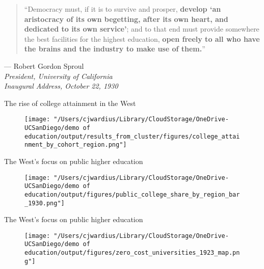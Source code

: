 \documentclass[notes,11pt, aspectratio=169]{beamer}
\begin{document}
\begin{frame}
  \begin{quote}
    ``Democracy must, if it is to survive and prosper, \textbf{develop `an aristocracy of its own begetting, after its own heart, and dedicated to its own service'}; and to that end must provide somewhere the best facilities for the highest education, \textbf{open freely to all who have the brains and the industry to make use of them.}''
  \end{quote}
  
  \vspace{0.5cm}
  
  \raggedleft
  --- Robert Gordon Sproul \\
  \textit{President, University of California} \\
  \textit{Inaugural Address, October 22, 1930}
\end{frame}


\begin{frame}{The rise of college attainment in the West}
  \begin{figure}
        \centering
        \texttt{[image: "/Users/cjwardius/Library/CloudStorage/OneDrive-UCSanDiego/demo of education/output/results\_from\_cluster/figures/college\_attainment\_by\_cohort\_region.png"]}
    \end{figure}
\end{frame}



\begin{frame}[label=west_focuses_on_public]{The West's focus on public higher education}
  \begin{figure}
        \centering
        \texttt{[image: "/Users/cjwardius/Library/CloudStorage/OneDrive-UCSanDiego/demo of education/output/figures/public\_college\_share\_by\_region\_bar\_1930.png"]}
    \end{figure}
    \centering
    \hyperlink{regional_trends_k_12_expend}{}
    \hyperlink{regional_junior_foundings}{}
\end{frame}


\begin{frame}{The West's focus on public higher education}
  \begin{figure}
        \centering
        \texttt{[image: "/Users/cjwardius/Library/CloudStorage/OneDrive-UCSanDiego/demo of education/output/figures/zero\_cost\_universities\_1923\_map.png"]}
    \end{figure}
\end{frame}
\end{document}
